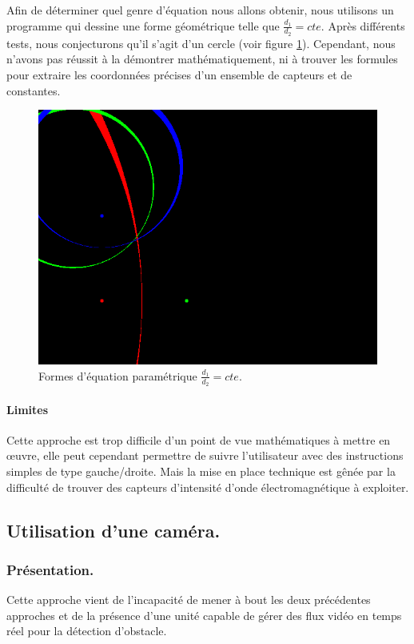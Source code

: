 \documentclass{article}
\begin{document}
Afin de déterminer quel genre d'équation nous allons obtenir, nous utilisons un programme qui dessine une forme géométrique telle que $\frac{d_1}{d_2} = cte$. Après différents tests, nous conjecturons qu'il s'agit d'un cercle (voir figure \ref{circle}). Cependant, nous n'avons pas réussit à la démontrer mathématiquement, ni à trouver les formules pour extraire les coordonnées précises d'un ensemble de capteurs et de constantes.

\begin{figure}
    \begin{center}
        \includegraphics[width=0.75\linewidth]{rcs/circle.png}
    \end{center}
    \caption{Formes d'équation paramétrique $\frac{d_1}{d_2}=cte$.}
    \label{circle}
\end{figure}

\paragraph{Limites} Cette approche est trop difficile d'un point de vue mathématiques à mettre en œuvre, elle peut cependant permettre de suivre l'utilisateur avec des instructions simples de type gauche/droite. Mais la mise en place technique est gênée par la difficulté de trouver des capteurs d'intensité d'onde électromagnétique à exploiter.

\subsection{Utilisation d'une caméra.}
\subsubsection{Présentation.}
Cette approche vient de l'incapacité de mener à bout les deux précédentes approches et de la présence d'une unité capable de gérer des flux vidéo en temps réel pour la détection d'obstacle.
\end{document}
